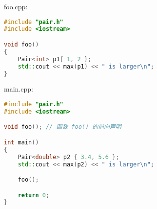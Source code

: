 \documentclass[../../LearnCpp.tex]{subfiles}
\begin{document}
foo.cpp:

\begin{lstlisting}[language=C++]
#include "pair.h"
#include <iostream>

void foo()
{
    Pair<int> p1{ 1, 2 };
    std::cout << max(p1) << " is larger\n";
}
\end{lstlisting}

main.cpp:

\begin{lstlisting}[language=C++]
#include "pair.h"
#include <iostream>

void foo(); // 函数 foo() 的前向声明

int main()
{
    Pair<double> p2 { 3.4, 5.6 };
    std::cout << max(p2) << " is larger\n";

    foo();

    return 0;
}
\end{lstlisting}
\end{document}
